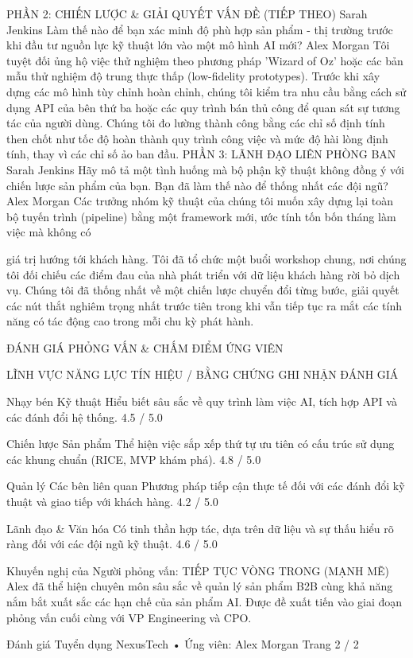 PHẦN 2: CHIẾN LƯỢC \& GIẢI QUYẾT VẤN ĐỀ (TIẾP THEO)
Sarah Jenkins
Làm thế nào để bạn xác minh độ phù hợp sản phẩm - thị trường trước khi đầu tư nguồn lực kỹ thuật lớn vào một mô hình AI mới?
Alex Morgan
Tôi tuyệt đối ủng hộ việc thử nghiệm theo phương pháp 'Wizard of Oz' hoặc các bản mẫu thử nghiệm độ trung thực thấp (low-fidelity prototypes). Trước khi xây dựng các mô hình tùy chỉnh hoàn chỉnh, chúng tôi kiểm tra nhu cầu bằng cách sử dụng API của bên thứ ba hoặc các quy trình bán thủ công để quan sát sự tương tác của người dùng. Chúng tôi đo lường thành công bằng các chỉ số định tính then chốt như tốc độ hoàn thành quy trình công việc và mức độ hài lòng định tính, thay vì các chỉ số ảo ban đầu.
PHẦN 3: LÃNH ĐẠO LIÊN PHÒNG BAN
Sarah Jenkins
Hãy mô tả một tình huống mà bộ phận kỹ thuật không đồng ý với chiến lược sản phẩm của bạn. Bạn đã làm thế nào để thống nhất các đội ngũ?
Alex Morgan
Các trưởng nhóm kỹ thuật của chúng tôi muốn xây dựng lại toàn bộ tuyến trình (pipeline) bằng một framework mới, ước tính tốn bốn tháng làm việc mà không có

giá trị hướng tới khách hàng. Tôi đã tổ chức một buổi workshop chung, nơi chúng tôi đối chiếu các điểm đau của nhà phát triển với dữ liệu khách hàng rời bỏ dịch vụ. Chúng tôi đã thống nhất về một chiến lược chuyển đổi từng bước, giải quyết các nút thắt nghiêm trọng nhất trước tiên trong khi vẫn tiếp tục ra mắt các tính năng có tác động cao trong mỗi chu kỳ phát hành.

ĐÁNH GIÁ PHỎNG VẤN \& CHẤM ĐIỂM ỨNG VIÊN

LĨNH VỰC NĂNG LỰC
TÍN HIỆU / BẰNG CHỨNG GHI NHẬN
ĐÁNH GIÁ

Nhạy bén Kỹ thuật
Hiểu biết sâu sắc về quy trình làm việc AI, tích hợp API và các đánh đổi hệ thống.
4.5 / 5.0

Chiến lược Sản phẩm
Thể hiện việc sắp xếp thứ tự ưu tiên có cấu trúc sử dụng các khung chuẩn (RICE, MVP khám phá).
4.8 / 5.0

Quản lý Các bên liên quan
Phương pháp tiếp cận thực tế đối với các đánh đổi kỹ thuật và giao tiếp với khách hàng.
4.2 / 5.0

Lãnh đạo \& Văn hóa
Có tinh thần hợp tác, dựa trên dữ liệu và sự thấu hiểu rõ ràng đối với các đội ngũ kỹ thuật.
4.6 / 5.0

Khuyến nghị của Người phỏng vấn: TIẾP TỤC VÒNG TRONG (MẠNH MẼ)
Alex đã thể hiện chuyên môn sâu sắc về quản lý sản phẩm B2B cùng khả năng nắm bắt xuất sắc các hạn chế của sản phẩm AI. Được đề xuất tiến vào giai đoạn phỏng vấn cuối cùng với VP Engineering và CPO.

Đánh giá Tuyển dụng NexusTech • Ứng viên: Alex Morgan
Trang 2 / 2
